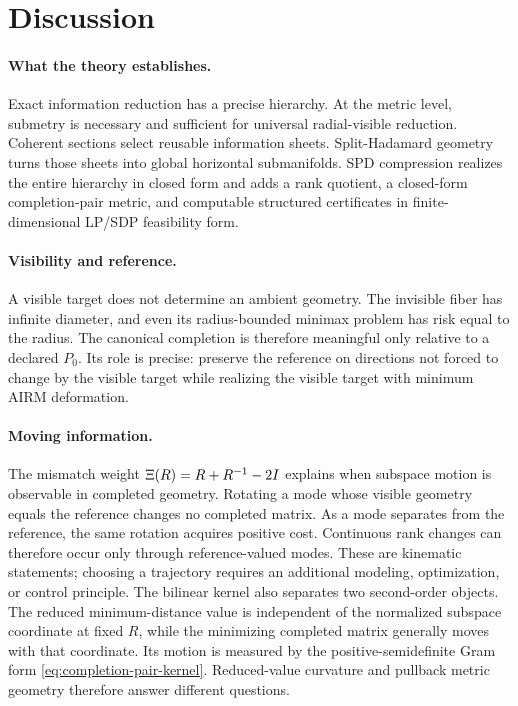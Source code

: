 \section{Discussion}
\label{sec:discussion}

\paragraph{What the theory establishes.}
Exact information reduction has a precise hierarchy.  At the metric level,
submetry is necessary and sufficient for universal radial-visible reduction.
Coherent sections select reusable information sheets.  Split-Hadamard
geometry turns those sheets into global horizontal submanifolds.  SPD
compression realizes the entire hierarchy in closed form and adds a rank
quotient, a closed-form completion-pair metric, and computable structured
certificates in finite-dimensional LP/SDP feasibility form.

\paragraph{Visibility and reference.}
A visible target does not determine an ambient geometry.  The invisible fiber
has infinite diameter, and even its radius-bounded minimax problem has risk
equal to the radius.  The canonical completion is therefore meaningful only
relative to a declared \(P_0\).  Its role is precise: preserve the reference
on directions not forced to change by the visible target while realizing the
visible target with minimum AIRM deformation.

\paragraph{Moving information.}
The mismatch weight \(\Xi(R)=R+R^{-1}-2I\) explains when subspace motion is
observable in completed geometry.  Rotating a mode whose visible geometry
equals the reference changes no completed matrix.  As a mode separates from
the reference, the same rotation acquires positive cost.  Continuous rank
changes can therefore occur only through reference-valued modes.  These are
kinematic statements; choosing a trajectory requires an additional modeling,
optimization, or control principle.  The bilinear kernel also separates two
second-order objects.  The reduced minimum-distance value is independent of
the normalized subspace coordinate at fixed \(R\), while the minimizing
completed matrix generally moves with that coordinate.  Its motion is
measured by the positive-semidefinite Gram form
\eqref{eq:completion-pair-kernel}.  Reduced-value curvature and pullback
metric geometry therefore answer different questions.

